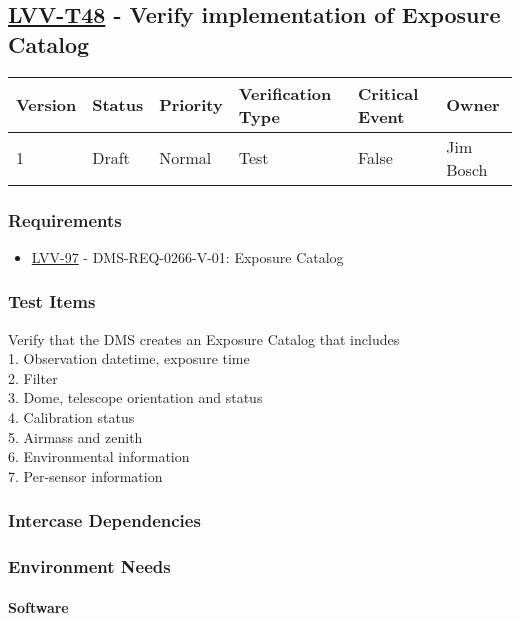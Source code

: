 \subsection{\href{https://jira.lsstcorp.org/secure/Tests.jspa\#/testCase/LVV-T48}{LVV-T48}
    - Verify implementation of Exposure Catalog}\label{lvv-t48}

\begin{longtable}[]{llllll}
\toprule
Version & Status & Priority & Verification Type & Critical Event & Owner
\\\midrule
1 & Draft & Normal &
Test & False & Jim Bosch
\\\bottomrule
\end{longtable}

\subsubsection{Requirements}
\begin{itemize}
\item \href{https://jira.lsstcorp.org/browse/LVV-97}{LVV-97} - DMS-REQ-0266-V-01: Exposure Catalog
\end{itemize}

\subsubsection{Test Items}
Verify that the DMS creates an Exposure Catalog that includes\\
1. Observation datetime, exposure time\\
2. Filter\\
3. Dome, telescope orientation and status\\
4. Calibration status\\
5. Airmass and zenith\\
6. Environmental information\\
7. Per-sensor information



\subsubsection{Intercase Dependencies}

\subsubsection{Environment Needs}

\paragraph{Software}

